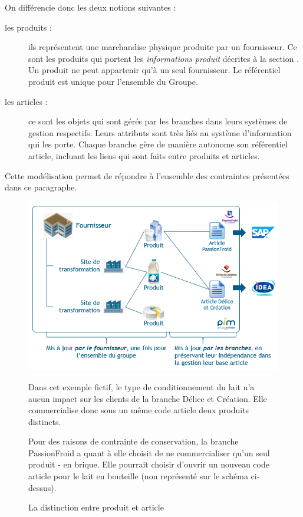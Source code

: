             On différencie donc les deux notions suivantes : 
            \begin{description}
                \item[les produits :] ils représentent une marchandise physique produite par un fournisseur. Ce sont les produits qui portent les \emph{informations produit} décrites à la section . Un produit ne peut appartenir qu'à un seul fournisseur. Le référentiel produit est unique pour l'ensemble du Groupe.
                \item[les articles :] ce sont les objets qui sont gérés par les branches dans leurs systèmes de gestion respectifs. Leurs attributs sont très liés au système d'information qui les porte. Chaque branche gère de manière autonome son référentiel article, incluant les liens qui sont faits entre produits et articles.
            \end{description}
            Cette modélisation permet de répondre à l'ensemble des contraintes présentées dans ce paragraphe.

            \begin{figure}[htbp]
                \begin{center}
                \includegraphics[width=\linewidth]{img/Produit article.png}
                \end{center}
                Dans cet exemple fictif, le type de conditionnement du lait n'a aucun impact sur les clients de la branche Délice et Création. Elle commercialise donc sous un même code article deux produits distincts.

                Pour des raisons de contrainte de conservation, la branche PassionFroid a quant à elle choisit de ne commercialiser qu'un seul produit - en brique. Elle pourrait choisir d'ouvrir un nouveau code article pour le lait en bouteille (non représenté sur le schéma ci-dessus).
                \caption{La distinction entre produit et article}
                \label{fig:produit_article}
            \end{figure}          

